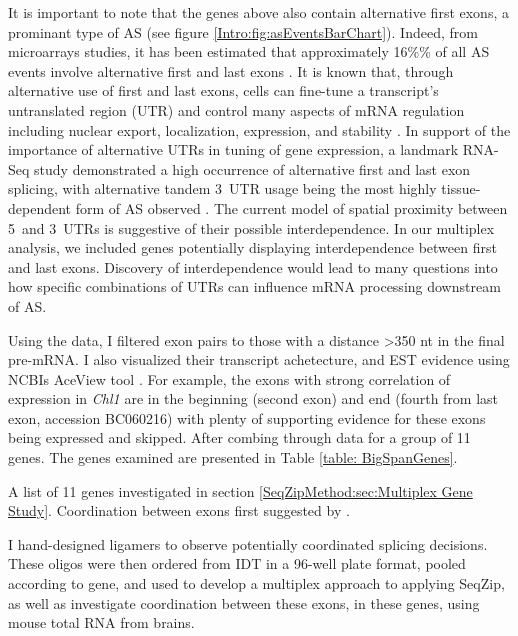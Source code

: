   It is important to note that the genes above also contain alternative first exons, a prominant type of AS (see figure \ref{Intro:fig:asEventsBarChart}). Indeed, from microarrays studies, it has been estimated that approximately 16\%\% of all AS events involve alternative first and last exons \citep{Bingham2008}. It is known that, through alternative use of first and last exons, cells can fine-tune a transcript's untranslated region (UTR) and control many aspects of mRNA regulation including nuclear export, localization, expression, and stability \citep{Hughes2006}. In support of the importance of alternative UTRs in tuning of gene expression, a landmark RNA-Seq study demonstrated a high occurrence of alternative first and last exon splicing, with alternative tandem 3\textprime~UTR usage being the most highly tissue-dependent form of AS observed \citep{Wang2008}. The current model of spatial proximity between 5\textprime~and 3\textprime~UTRs is suggestive of their possible interdependence. In our multiplex analysis, we included genes potentially displaying interdependence between first and last exons. Discovery of interdependence would lead to many questions into how specific combinations of UTRs can influence mRNA processing downstream of AS.

  Using the \citet{Fagnani2007} data, I filtered exon pairs to those with a distance >350 nt in the final pre-mRNA. I also visualized their transcript achetecture, and EST evidence using NCBIs AceView tool \citep{Thierry-Mieg2006}. For example, the exons with strong correlation of expression in \textit{Chl1} are in the beginning (second exon) and end (fourth from last exon, accession BC060216) with plenty of supporting evidence for these exons being expressed and skipped. After combing through \citep{Fagnani2007} data for a group of 11 genes. The genes examined are presented in Table \ref{table: BigSpanGenes}.

  \begin{table} %
    \caption[Mouse genes with large sequence between suggested coordinated cassette exons]
      {
        A list of 11 genes investigated in section \ref{SeqZipMethod:sec:Multiplex Gene Study}. Coordination between exons first suggested by \citep{Fagnani2007}.
        }
    \label{table: BigSpanGenes}
    
    \end{table}

  I hand-designed ligamers to observe potentially coordinated splicing decisions. These oligos were then ordered from IDT in a 96-well plate format, pooled according to gene, and used to develop a multiplex approach to applying SeqZip, as well as investigate coordination between these exons, in these genes, using mouse total RNA from brains.

